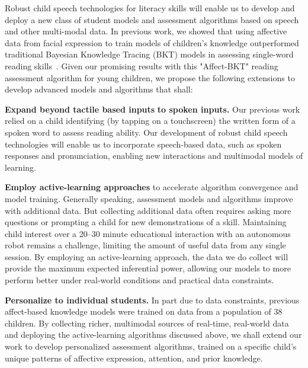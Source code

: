 Robust child speech technologies for literacy skills will enable us to develop and deploy a new class of student models and assessment algorithms based on speech and other multi-modal data. In previous work, we showed that using affective data from facial expression to train models of children's knowledge outperformed traditional Bayesian Knowledge Tracing (BKT) models in assessing single-word reading skills~\cite{Spaulding_Gordon_Breazeal_2016}. Given our promising results with this "Affect-BKT" reading assessment algorithm for young children, we propose the following extensions to develop advanced models and algorithms that shall:


{\bf Expand beyond tactile based inputs} {\bf to spoken inputs.} Our previous work relied on a child identifying (by tapping on a touchscreen) the written form of a spoken word to assess reading ability. Our development of robust child speech technologies will enable us to incorporate speech-based data, such as spoken responses and pronunciation, enabling new interactions and multimodal models of learning.

{\bf Employ active-learning approaches} to accelerate algorithm convergence and model training. Generally speaking, assessment models and algorithms improve with additional data. But collecting additional data often requires asking more questions or prompting a child for new demonstrations of a skill. Maintaining child interest over a 20--30 minute educational interaction with an autonomous robot remains a challenge, limiting the amount of useful data from any single session. By employing an active-learning approach, the data we do collect will provide the maximum expected inferential power, allowing our models to more perform better under real-world conditions and practical data constraints.

{\bf Personalize to individual students.} In part due to data constraints, previous affect-based knowledge models were trained on data from a population of 38 children. By collecting richer, multimodal sources of real-time, real-world data and deploying the active-learning algorithms discussed above, we shall extend our work to develop personalized assessment algorithms, trained on a specific child's unique patterns of affective expression, attention, and prior knowledge.

